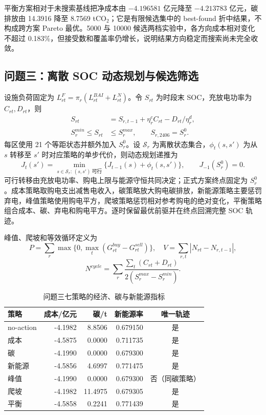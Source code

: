平衡方案相对于未搜索基线把净成本由 $-4.196581$ 亿元降至 $-4.213783$ 亿元，碳排放由 14.3916 降至 8.7569 tCO$_2$；它是有限候选集中的 best-found 折中结果，不构成跨方案 Pareto 最优。5000 与 10000 候选两档实验中，各方向成本相对变化不超过 0.183\%，但接受数和覆盖率仍增长，说明结果方向稳定而搜索尚未完全收敛。

\subsection{问题三：离散 SOC 动态规划与候选筛选}
设施负荷固定为 $L^F_{rt}=\pi_r(L^{BAI}_{rt}+L^N_{rt})$。令 $S_{rt}$ 为时段末 SOC，充放电功率为 $C_{rt},D_{rt}$，则
\begin{align}
S_{rt}&=S_{r,t-1}+\eta_r^cC_{rt}-D_{rt}/\eta_r^d,\\
S_r^{min}\le S_{rt}&\le S_r^{max},\qquad S_{r,2406}=S_r^0.
\end{align}
每区使用 21 个等距状态并额外加入 $S_r^0$。设 $\mathcal S_r$ 为离散状态集合，$\phi_t(s,s')$ 为从 $s$ 转移至 $s'$ 时对应策略的单步代价，则动态规划递推为
\begin{equation}
J_t(s')=\min_{s\in\mathcal S_r:\,(s,s')\ \text{可行}}\{J_{t-1}(s)+\phi_t(s,s')\},
\qquad J_{-1}(S_r^0)=0.
\end{equation}
可行转移由充放电功率、购电上限与能源守恒共同决定；正式方案终点固定为 $S_r^0$。成本策略取购电支出减售电收入，碳策略放大购电碳排放，新能源策略主要惩罚弃电，峰值策略使用购电平方，爬坡策略惩罚相对参考购电的绝对变化，平衡策略组合成本、碳、弃电和购电平方。逐时保留最优前驱并在终点回溯完整 SOC 轨迹。

峰值、爬坡和等效循环定义为
\begin{equation}
P=\sum_r\max\{0,\max_t(G^{buy}_{rt}-G^{sell}_{rt})\},\quad
V=\sum_{r,t}|N_{rt}-N_{r,t-1}|,
\end{equation}
\begin{equation}
N^{cycle}=\sum_r\frac{\sum_t(C_{rt}+D_{rt})}{2(S_r^{max}-S_r^{min})}.
\end{equation}

\begin{table}[H]\centering
{\small
\caption{问题三七策略的经济、碳与新能源指标}\label{tab:q3policies}
\begin{tabular}{lrrrc}\toprule
策略 & 成本/亿元 & 碳/t & 新能源率 & 唯一轨迹\\\midrule
no-action & -4.1982 & 8.8506 & 0.679150 & 是\\
成本 & -4.5875 & 0.0000 & 0.711735 & 是\\
碳 & -4.1990 & 0.0000 & 0.679300 & 是\\
新能源 & -4.5856 & 4.6997 & 0.771475 & 是\\
峰值 & -4.1990 & 0.0000 & 0.679300 & 否（同碳策略）\\
爬坡 & -4.1982 & 11.4975 & 0.679305 & 是\\
平衡 & -4.5858 & 0.2241 & 0.771439 & 是\\\bottomrule
\end{tabular}
}
\end{table}

